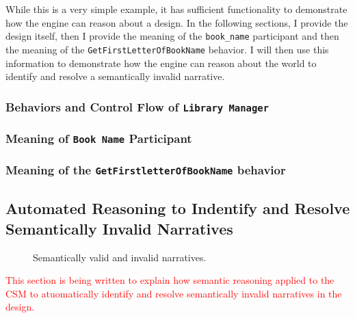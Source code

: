 While this is a very simple example, it has sufficient functionality to demonstrate how the engine can reason about a design. In the following sections, I provide the design itself, then I provide the meaning of the \texttt{book\_name} participant and then the meaning of the \texttt{GetFirstLetterOfBookName} behavior. I will then use this information to demonstrate how the engine can reason about the world to identify and resolve a semantically invalid narrative.

\subsubsection{Behaviors and Control Flow of \texttt{Library Manager}}

\subsubsection{Meaning of \texttt{Book Name} Participant}

\subsubsection{Meaning of the \texttt{GetFirstletterOfBookName} behavior}

\subsection{Automated Reasoning to Indentify and Resolve Semantically Invalid Narratives}

\begin{figure}[htbp]
    
    \caption{Semantically valid and invalid narratives.}
    \label{fig:sample_narratives}
\end{figure}

\textcolor{red}{This section is being written to explain how semantic reasoning applied to the CSM to atuomatically identify and resolve semantically invalid narratives in the design.}